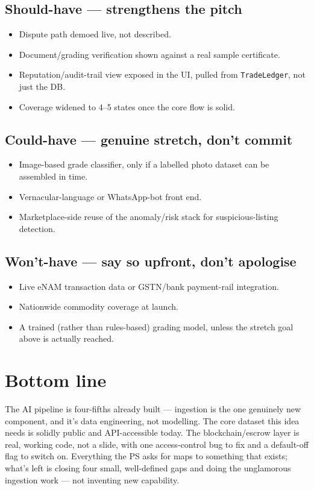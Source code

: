 \documentclass[11pt]{article}
\begin{document}
\subsection*{Should-have --- strengthens the pitch}
\begin{itemize}[leftmargin=1.4em]
\item Dispute path demoed live, not described.
\item Document/grading verification shown against a real sample certificate.
\item Reputation/audit-trail view exposed in the UI, pulled from \texttt{TradeLedger}, not just the DB.
\item Coverage widened to 4--5 states once the core flow is solid.
\end{itemize}

\subsection*{Could-have --- genuine stretch, don't commit}
\begin{itemize}[leftmargin=1.4em]
\item Image-based grade classifier, only if a labelled photo dataset can be assembled in time.
\item Vernacular-language or WhatsApp-bot front end.
\item Marketplace-side reuse of the anomaly/risk stack for suspicious-listing detection.
\end{itemize}

\subsection*{Won't-have --- say so upfront, don't apologise}
\begin{itemize}[leftmargin=1.4em]
\item Live eNAM transaction data or GSTN/bank payment-rail integration.
\item Nationwide commodity coverage at launch.
\item A trained (rather than rules-based) grading model, unless the stretch goal above is actually reached.
\end{itemize}

\section*{Bottom line}
The AI pipeline is four-fifths already built --- ingestion is the one genuinely new component, and it's data
engineering, not modelling. The core dataset this idea needs is solidly public and API-accessible today.
The blockchain/escrow layer is real, working code, not a slide, with one access-control bug to fix and a
default-off flag to switch on. Everything the PS asks for maps to something that exists; what's left is
closing four small, well-defined gaps and doing the unglamorous ingestion work --- not inventing new
capability.
\end{document}
